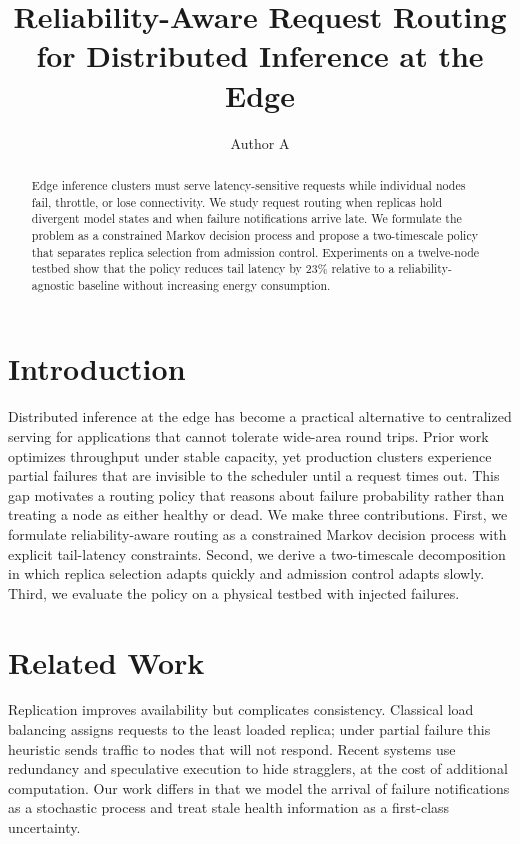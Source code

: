 \documentclass[conference]{IEEEtran}
\title{Reliability-Aware Request Routing for Distributed Inference at the Edge}
\author{Author A}
\begin{document}
\maketitle

\begin{abstract}
Edge inference clusters must serve latency-sensitive requests while individual nodes fail, throttle, or lose connectivity.
We study request routing when replicas hold divergent model states and when failure notifications arrive late.
We formulate the problem as a constrained Markov decision process and propose a two-timescale policy that separates replica selection from admission control.
Experiments on a twelve-node testbed show that the policy reduces tail latency by 23\% relative to a reliability-agnostic baseline without increasing energy consumption.
\end{abstract}

\section{Introduction}
\label{sec:intro}
Distributed inference at the edge has become a practical alternative to centralized serving for applications that cannot tolerate wide-area round trips.
Prior work optimizes throughput under stable capacity, yet production clusters experience partial failures that are invisible to the scheduler until a request times out.
This gap motivates a routing policy that reasons about failure probability rather than treating a node as either healthy or dead.
We make three contributions.
First, we formulate reliability-aware routing as a constrained Markov decision process with explicit tail-latency constraints.
Second, we derive a two-timescale decomposition in which replica selection adapts quickly and admission control adapts slowly.
Third, we evaluate the policy on a physical testbed with injected failures.

\section{Related Work}
\label{sec:related}
Replication improves availability but complicates consistency.
Classical load balancing assigns requests to the least loaded replica; under partial failure this heuristic sends traffic to nodes that will not respond.
Recent systems use redundancy and speculative execution to hide stragglers, at the cost of additional computation.
Our work differs in that we model the arrival of failure notifications as a stochastic process and treat stale health information as a first-class uncertainty.
\end{document}
